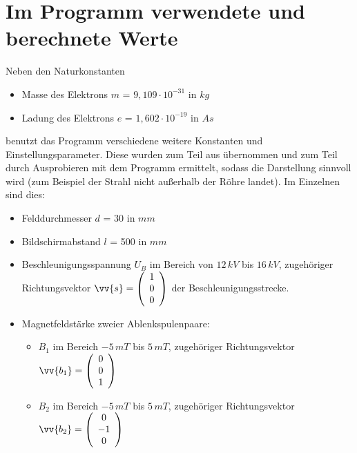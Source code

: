 \section{Im Programm verwendete und berechnete Werte}
\label{sec:Appendix}
Neben den Naturkonstanten
\begin{itemize}
    \item Masse des Elektrons $m$ =  $9,109 \cdot 10^{-31}$ in $kg$
    \item Ladung des Elektrons $e$ = $1,602 \cdot 10^{-19}$ in $As$
\end{itemize} 
benutzt das Programm verschiedene weitere Konstanten und Einstellungsparameter. 
Diese wurden zum Teil aus \cite{Gente1950} übernommen und zum Teil durch Ausprobieren mit dem Programm ermittelt, sodass die Darstellung sinnvoll wird (zum Beispiel der Strahl nicht außerhalb der Röhre landet).
Im Einzelnen sind dies:
\begin{itemize}
    \item Felddurchmesser $d$ = 30 in $mm$
    \item Bildschirmabstand $l$ = 500 in $mm$
    \item Beschleunigungsspannung $U_B$ im Bereich von $12 \, kV$ bis $16 \, kV$, zugehöriger Richtungsvektor $\vv{s} = \vektor{1}{0}{0}$ der Beschleunigungsstrecke.
    \item Magnetfeldstärke zweier Ablenkspulenpaare:
    \begin{itemize}
        \item $B_1$ im Bereich $-5 \, mT$ bis $5 \, mT$, zugehöriger Richtungsvektor $\vv{b_1} = \vektor{0}{0}{1}$ %
        \item $B_2$ im Bereich $-5 \, mT$ bis $5 \, mT$, zugehöriger Richtungsvektor $\vv{b_2} = \vektor{0}{-1}{0}$ %
    \end{itemize}
\end{itemize}

